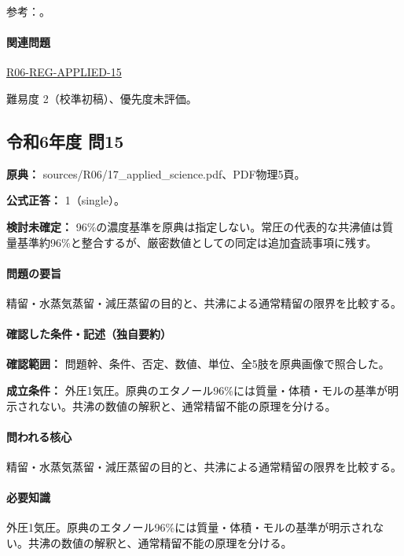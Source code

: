 \par 参考：\cite{nptel_distillation1,nptel_azeotrope}。

\paragraph{関連問題} \hyperref[q:r06-reg-applied-15]{R06-REG-APPLIED-15}

\par 難易度 2（校準初稿）、優先度未評価。

\subsection{令和6年度 問15}
\label{q:r06-reg-applied-15}

\noindent\textbf{原典：} sources/R06/17\_applied\_science.pdf、PDF物理5頁。

\textbf{公式正答：} 1（single）。

\par\textbf{検討未確定：} 96\%の濃度基準を原典は指定しない。常圧の代表的な共沸値は質量基準約96\%と整合するが、厳密数値としての同定は追加査読事項に残す。

\paragraph{問題の要旨} 精留・水蒸気蒸留・減圧蒸留の目的と、共沸による通常精留の限界を比較する。

\paragraph{確認した条件・記述（独自要約）}\mbox{}\par

\noindent\textbf{確認範囲：} 問題幹、条件、否定、数値、単位、全5肢を原典画像で照合した。\par

\noindent\textbf{成立条件：} 外圧1気圧。原典のエタノール96\%には質量・体積・モルの基準が明示されない。共沸の数値の解釈と、通常精留不能の原理を分ける。\par

\paragraph{問われる核心} 精留・水蒸気蒸留・減圧蒸留の目的と、共沸による通常精留の限界を比較する。

\paragraph{必要知識} 外圧1気圧。原典のエタノール96\%には質量・体積・モルの基準が明示されない。共沸の数値の解釈と、通常精留不能の原理を分ける。

